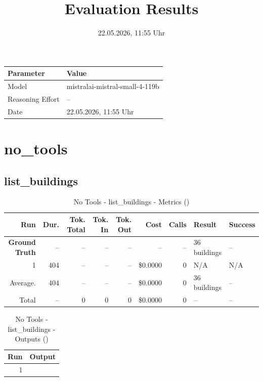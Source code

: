 \documentclass[a4paper,11pt]{article}
\title{Evaluation Results}
\date{22.05.2026, 11:55 Uhr}
\begin{document}
\maketitle

\begin{table}[H]
\centering
\begin{tabular}{l l}
\toprule
\textbf{Parameter} & \textbf{Value} \\
\midrule
Model & mistralai-mistral-small-4-119b \\
Reasoning Effort & -- \\
Date & 22.05.2026, 11:55 Uhr \\
\bottomrule
\end{tabular}
\end{table}

\tableofcontents
\clearpage

\section{no\_tools}

\subsection{list\_buildings}

\begin{table}[ht]
\centering
\scriptsize
\caption{No Tools - list\_buildings - Metrics ()}
\label{tab:no\_tools\_list\_buildings\_metrics\_}
\begin{tabular}{r r r r r r r p{3cm} l}
\hline
Run & Dur. & Tok. Total & Tok. In & Tok. Out & Cost & Calls & Result & Success \\
\hline
\textbf{Ground Truth} & -- & -- & -- & -- & -- & -- & 36 buildings & -- \\
\hline
1 & 404 & -- & -- & -- & \$0.0000 & 0 & N/A & N/A \\
\hline
Average. & 404 & -- & -- & -- & \$0.0000 & 0 & 36 buildings & -- \\
Total & -- & 0 & 0 & 0 & \$0.0000 & 0 & -- & -- \\
\hline
\end{tabular}
\end{table}

\clearpage

\begin{table}[ht]
\centering
\scriptsize
\caption{No Tools - list\_buildings - Outputs ()}
\label{tab:no\_tools\_list\_buildings\_outputs\_}
\begin{tabular}{r p{12cm}}
\hline
Run & Output \\
\hline
1 &  \\
\hline
\end{tabular}
\end{table}

\clearpage
\end{document}
